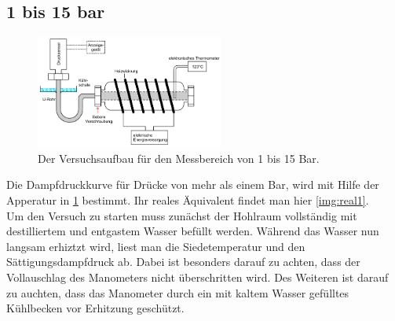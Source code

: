 \subsection{1 bis 15 bar}
\begin{figure}[H]
    \centering
    \includegraphics[width=0.55\textwidth]{images/Abbildung4.PNG}
    \caption{Der Versuchsaufbau für den Messbereich von 1 bis 15 Bar.}
    \label{img:aufbau2}
\end{figure}
Die Dampfdruckkurve für Drücke von mehr als einem Bar, wird mit Hilfe  der Apperatur in \ref{img:aufbau2} bestimmt. Ihr reales Äquivalent findet man hier \ref{img:real1}.\\
Um den Versuch zu starten muss zunächst der Hohlraum vollständig mit destilliertem und entgastem Wasser befüllt werden.
Während das Wasser nun langsam erhiztzt wird, liest man die Siedetemperatur und den Sättigungsdampfdruck ab. Dabei ist besonders darauf zu 
achten, dass der Vollauschlag des Manometers nicht überschritten wird. Des Weiteren ist darauf zu auchten, dass das Manometer durch ein mit kaltem Wasser gefülltes 
Kühlbecken vor Erhitzung geschützt.